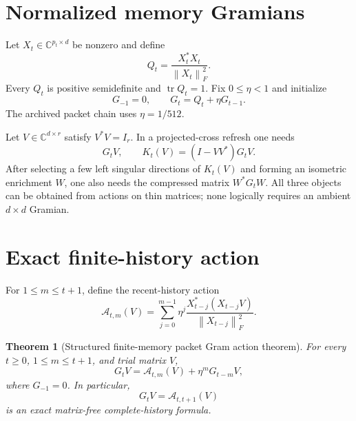 \documentclass[11pt]{article}
\newtheorem{theorem}{Theorem}[section]
\theoremstyle{definition}
\theoremstyle{remark}
\newcommand{\norm}[1]{\left\lVert#1\right\rVert}
\newcommand{\tr}{\operatorname{tr}}
\begin{document}
\section{Normalized memory Gramians}
\label{sec:setting}

Let $X_t\in\mathbb C^{p_t\times d}$ be nonzero and define
\begin{equation}
 Q_t=\frac{X_t^*X_t}{\norm{X_t}_F^2}.
 \label{eq:snapshot}
\end{equation}
Every $Q_t$ is positive semidefinite and $\tr Q_t=1$.  Fix
$0\le\eta<1$ and initialize
\begin{equation}
 G_{-1}=0,\qquad G_t=Q_t+\eta G_{t-1}.
 \label{eq:memory}
\end{equation}
The archived packet chain uses $\eta=1/512$.

Let $V\in\mathbb C^{d\times r}$ satisfy $V^*V=I_r$.  In a projected-cross
refresh one needs
\begin{equation}
 G_tV,\qquad K_t(V)=(I-VV^*)G_tV.
 \label{eq:needed-actions}
\end{equation}
After selecting a few left singular directions of $K_t(V)$ and forming an
isometric enrichment $W$, one also needs the compressed matrix
$W^*G_tW$.  All three objects can be obtained from actions on thin matrices;
none logically requires an ambient $d\times d$ Gramian.

\section{Exact finite-history action}
\label{sec:identity}

For $1\le m\le t+1$, define the recent-history action
\begin{equation}
 \mathcal A_{t,m}(V)=
 \sum_{j=0}^{m-1}\eta^j
 \frac{X_{t-j}^*(X_{t-j}V)}{\norm{X_{t-j}}_F^2}.
 \label{eq:recent-action}
\end{equation}

\begin{theorem}[Structured finite-memory packet Gram action theorem]
\label{thm:action}
For every $t\ge0$, $1\le m\le t+1$, and trial matrix $V$,
\begin{equation}
 G_tV=\mathcal A_{t,m}(V)+\eta^mG_{t-m}V,
 \label{eq:action-identity}
\end{equation}
where $G_{-1}=0$.  In particular,
\begin{equation}
 G_tV=\mathcal A_{t,t+1}(V)
 \label{eq:full-history}
\end{equation}
is an exact matrix-free complete-history formula.
\end{theorem}
\end{document}
